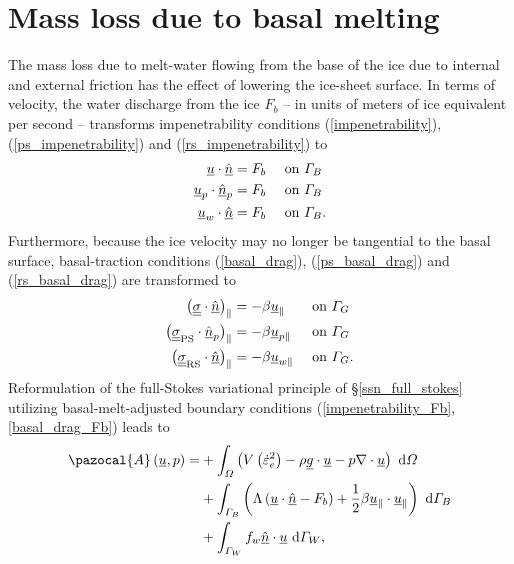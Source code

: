 \section{Mass loss due to basal melting} \label{ssn_mass_loss_due_to_melting}

The mass loss due to melt-water flowing from the base of the ice due to internal and external friction has the effect of lowering the ice-sheet surface.  In terms of velocity, the water discharge from the ice $F_b$ -- in units of meters of ice equivalent per second -- transforms impenetrability conditions (\ref{impenetrability}), (\ref{ps_impenetrability}) and (\ref{rs_impenetrability}) to
\begin{align}
  \label{impenetrability_Fb}
  \underline{u} \cdot \underline{\hat{n}} &= F_b  &&\text{ on } \varGamma_B \\
  \label{ps_impenetrability_Fb}
  \underline{u}_p \cdot \underline{\hat{n}}_p &= F_b  &&\text{ on } \varGamma_B \\
  \label{rs_impenetrability_Fb}
  \underline{u}_w \cdot \underline{\hat{n}} &= F_b  &&\text{ on } \varGamma_B.
\end{align}
Furthermore, because the ice velocity may no longer be tangential to the basal surface, basal-traction conditions (\ref{basal_drag}), (\ref{ps_basal_drag}) and (\ref{rs_basal_drag}) are transformed to 
\begin{align}
  \label{basal_drag_Fb}
  \big( \underline{\underline{\sigma}} \cdot \underline{\hat{n}} \big)_{\Vert} &= -\beta \underline{u}_{\Vert} &&\text{ on } \varGamma_G \\
  \label{ps_basal_drag_Fb}
  \big( \underline{\underline{\sigma}}_{\text{PS}} \cdot \underline{\hat{n}}_p \big)_{\Vert} &= -\beta \underline{u}_{p\Vert} &&\text{ on } \varGamma_G \\
  \label{rs_basal_drag_Fb}
  \big( \underline{\underline{\sigma}}_{\text{RS}} \cdot \underline{\hat{n}} \big)_{\Vert} &= -\beta \underline{u}_{w\Vert} &&\text{ on } \varGamma_G.
\end{align}
Reformulation of the full-Stokes variational principle of \S \ref{ssn_full_stokes} utilizing basal-melt-adjusted boundary conditions (\ref{impenetrability_Fb}, \ref{basal_drag_Fb}) leads to
\begin{align}
  \label{action_Fb}
  \pazocal{A} \left(\rankone{u}, p\right) = &+ \int_{\Omega} \left( V\left( \dot{\varepsilon}_e^2 \right) - \rho \rankone{g} \cdot \rankone{u} - p \nabla \cdot \rankone{u} \right) \d{\Omega} \notag \\
  &+ \int_{\Gamma_B} \left( \Lambda \left( \rankone{u} \cdot \normal - F_b \right) + \frac{1}{2} \beta \rankone{u}_{\Vert} \cdot \rankone{u}_{\Vert} \right) \d{\Gamma_B} \notag \\
  &+ \int_{\Gamma_W} f_w \normal \cdot \rankone{u} \d{\Gamma_W},
\end{align}
